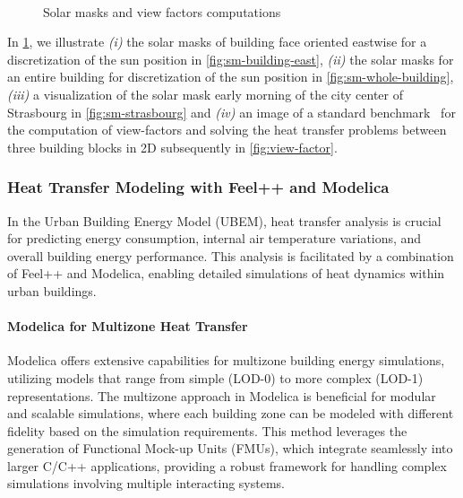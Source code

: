 \documentclass[runningheads]{llncs}
\begin{document}
\begin{figure}[ht]
\centering
{}
\hfill
{}\\
\hfill
{}
\caption{Solar masks and view factors computations}
\label{fig:solar-masks-vf}
\end{figure}

In \cref{fig:solar-masks-vf}, we illustrate \textit{(i)} the solar masks of building face oriented eastwise for a discretization of the sun position in \cref{fig:sm-building-east}, \textit{(ii)} the solar masks for an entire building for discretization of the sun position in \cref{fig:sm-whole-building}, \textit{(iii)} a visualization of the solar mask early morning of the city center of Strasbourg in \cref{fig:sm-strasbourg} and \textit{(iv)} an image of a standard benchmark~\cite{van_eck_surface_2016} for the computation of view-factors and solving the heat transfer problems between three building blocks in 2D subsequently in \cref{fig:view-factor}.

\subsubsection{Heat Transfer Modeling with Feel++ and Modelica}
In the Urban Building Energy Model (UBEM), heat transfer analysis is crucial for predicting energy consumption, internal air temperature variations, and overall building energy performance. This analysis is facilitated by a combination of Feel++ and Modelica, enabling detailed simulations of heat dynamics within urban buildings.

\paragraph{Modelica for Multizone Heat Transfer}
Modelica offers extensive capabilities for multizone building energy simulations, utilizing models that range from simple (LOD-0) to more complex (LOD-1) representations. The multizone approach in Modelica is beneficial for modular and scalable simulations, where each building zone can be modeled with different fidelity based on the simulation requirements. This method leverages the generation of Functional Mock-up Units (FMUs), which integrate seamlessly into larger C/C++ applications, providing a robust framework for handling complex simulations involving multiple interacting systems.
\end{document}
